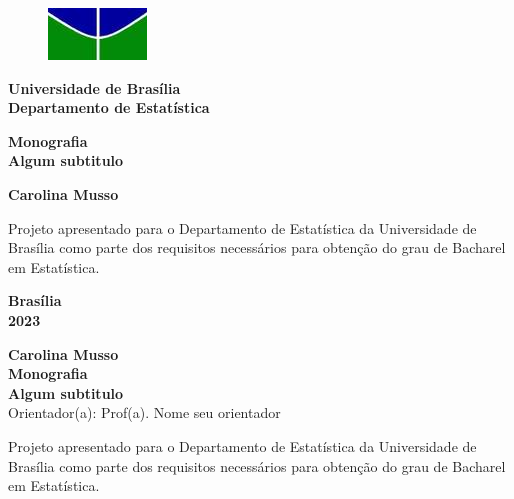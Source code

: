 \documentclass[12pt, a4paper, twoside]{article}
\numberwithin{equation}{subsection} %
\newcommand{\titulo}{Monografia \\ Algum subtitulo}
\newcommand{\autor}{Carolina Musso}
\newcommand{\orientador}{ Prof(a). Nome seu orientador }
\newcommand{\coorientador}{ Prof(a).  }
\begin{document}
\begin{titlepage}
\begin{center}
\begin{figure}[h!]
	\centering
		\includegraphics[scale = 0.8]{unb.png}
	\label{fig:unb}
\end{figure}
{\bf Universidade de Brasília \\
\bf Departamento de Estatística}
\vspace{5cm}

\setcounter{page}{0}
\null
\textbf{\titulo}
\vspace{2.5cm}


\vspace{0.2cm}
\textbf{\autor}
\end{center}
\vspace{1.5cm}

\begin{flushright}
\begin{minipage}{7.5cm}
\parbox[t]{7.5cm}{Projeto apresentado para o Departamento de Estatística
da Universidade de Brasília como parte dos requisitos necessários para
obtenção do grau de Bacharel em Estatística.}
\end{minipage}
\end{flushright}

\vspace{5cm}

\begin{center}
{\bf{Brasília} \\ }
\bf{2023}
\end{center}
\end{titlepage}



\thispagestyle{empty}

\begin{center}
\textbf{\autor} \\
\vspace{5cm}
\textbf{\titulo} \\
\vspace{3cm}
\small
Orientador(a): \orientador \\
\end{center}


\vspace*{3cm}

\begin{flushright}
\begin{minipage}{7.5cm}
 \parbox[t]{7.5cm}{Projeto apresentado para o Departamento de
Estatística da Universidade de Brasília como parte dos requisitos
necessários para obtenção do grau de Bacharel em Estatística.}
\end{minipage}
\end{flushright}
\end{document}
